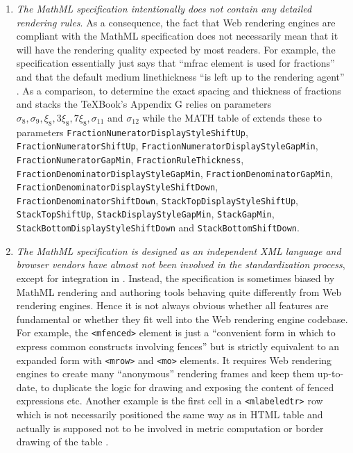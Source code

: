 \begin{enumerate}
\item {\em The MathML specification intentionally does not contain any detailed
  rendering rules}. As a consequence, the fact that Web rendering engines are
  compliant with the MathML specification does not necessarily mean that it
  will have the rendering quality expected by most readers.
  For example, the specification essentially just says that
  ``mfrac element is used for fractions'' and that the default medium
  linethickness ``is left up to the rendering agent'' \cite{MathML3}.
  As a comparison, to determine the exact spacing and thickness of
  fractions and stacks the
  \TeX Book's Appendix G \cite{TeXBook} relies
  on parameters $\sigma_8, \sigma_9, \xi_8, {3\xi_8}, {7\xi_8}, \sigma_{11}$ and
  $\sigma_{12}$ while the MATH table of \cite{OpenFontFormat3} extends these to
  parameters
  {\tt FractionNumeratorDisplayStyleShiftUp},
  {\tt FractionNumeratorShiftUp},
  {\tt FractionNumeratorDisplayStyleGapMin},
  {\tt FractionNumeratorGapMin},
  {\tt FractionRuleThickness},
  {\tt FractionDenominatorDisplayStyleGapMin},
  {\tt FractionDenominatorGapMin},
  {\tt FractionDenominatorDisplayStyleShiftDown},
  {\tt FractionDenominatorShiftDown},
  {\tt StackTopDisplayStyleShiftUp},
  {\tt StackTopShiftUp},
  {\tt StackDisplayStyleGapMin},
  {\tt StackGapMin},
  {\tt StackBottomDisplayStyleShiftDown} and
  {\tt StackBottomShiftDown}.
\item {\em The MathML specification is designed as an independent
  XML language and browser vendors have almost not been involved in the
  standardization process},
  except for integration in \cite{HTML5}.
  Instead, the specification is sometimes biased by MathML rendering and
  authoring tools behaving quite differently from Web rendering engines.
  Hence it is not always obvious whether all features are fundamental or
  whether they fit well into the Web rendering engine codebase.
  For example, the {\tt <mfenced>} element is just a
  ``convenient form in which to express common constructs involving fences''
  but is strictly equivalent to an expanded form with {\tt <mrow>} and
  {\tt <mo>} elements. It requires Web rendering engines
  to create many ``anonymous''
  rendering frames and keep them up-to-date, to duplicate the logic
  for drawing and exposing the content of fenced expressions etc.
  Another example is the first cell in a
  {\tt <mlabeledtr>} row which is not necessarily positioned the same way as
  in HTML table and actually is supposed not to be involved in metric
  computation or border drawing of the table \cite{MathML3}.
\end{enumerate}

